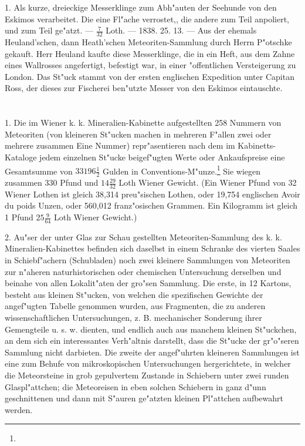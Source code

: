 \documentclass[a4paper, 11pt, oneside, polutonikogreek, german]{article}
\begin{document}
1. Als kurze, dreieckige Messerklinge zum Abh"auten der Seehunde von den Eskimos verarbeitet. Die eine Fl"ache verrostet,, die andere zum Teil anpoliert, und zum Teil ge"atzt. --- $\mathfrak{\frac{7}{32}}$ Loth. --- 1838. 25. 13. --- Aus der ehemals Heuland'schen, dann Heath'schen Meteoriten-Sammlung durch Herrn P"otschke gekauft. Herr Heuland kaufte diese Messerklinge, die in ein Heft, aus dem Zahne eines Wallrosses angefertigt, befestigt war, in einer "offentlichen Versteigerung zu London. Das St"uck stammt von der ersten englischen Expedition unter Capitan Ross, der dieses zur Fischerei ben"utzte Messer von den Eskimos eintauschte.
\clearpage
\section{}
\paragraph{}
1. Die im Wiener k. k. Mineralien-Kabinette aufgestellten 258 Nummern von Meteoriten (von kleineren St"ucken machen in mehreren F"allen zwei oder mehrere zusammen Eine Nummer) repr"asentieren nach dem im Kabinetts-Kataloge jedem einzelnen St"ucke beigef"ugten Werte oder Ankaufspreise eine Gesamtsumme von $\mathfrak{33196\frac{1}{2}}$ Gulden in Conventions-M"unze.\footnote{} Sie wiegen zusammen 330 Pfund und $\mathfrak{14\frac{29}{32}}$ Loth Wiener Gewicht. (Ein Wiener Pfund von 32 Wiener Lothen ist gleich 38,314 preu"sischen Lothen, oder 19,754 englischen Avoir du poids Unzen, oder 560,012 franz"osischen Grammen. Ein Kilogramm ist gleich 1 Pfund $\mathfrak{25\frac{9}{64}}$ Loth Wiener Gewicht.)

2. Au"ser der unter Glas zur Schau gestellten Meteoriten-Sammlung des k. k. Mineralien-Kabinettes befinden sich daselbst in einem Schranke des vierten Saales in Schiebf"achern (Schubladen) noch zwei kleinere Sammlungen von Meteoriten zur n"aheren naturhistorischen oder chemischen Untersuchung derselben und beinahe von allen Lokalit"aten der gro"sen Sammlung. Die erste, in 12 Kartons, besteht aus kleinen St"ucken, von welchen die spezifischen Gewichte der angef"ugten Tabelle genommen wurden, aus Fragmenten, die zu anderen wissenschaftlichen Untersuchungen, z. B. mechanischer Sonderung ihrer Gemengteile u. s. w. dienten, und endlich auch aus manchem kleinen St"uckchen, an dem sich ein interessantes Verh"altnis darstellt, dass die St"ucke der gr"o"seren Sammlung nicht darbieten. Die zweite der angef"uhrten kleineren Sammlungen ist eine zum Behufe von mikroskopischen Untersuchungen hergerichtete, in welcher die Meteorsteine in grob gepulvertem Zustande in Schiebern unter zwei runden Glaspl"attchen; die Meteoreisen in eben solchen Schiebern in ganz d"unn geschnittenen und dann mit S"auren ge"atzten kleinen Pl"attchen aufbewahrt werden.
\end{document}
